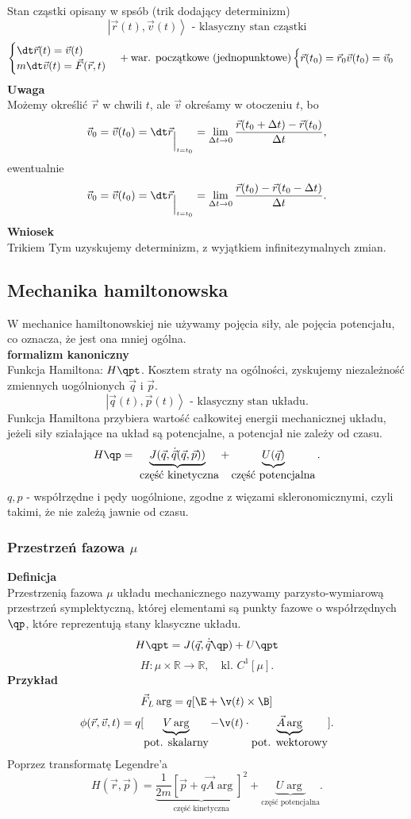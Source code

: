 Stan cząstki opisany w spsób (trik dodający determinizm) $$\left| \vec{r}(t)
,\vec{v}(t) \right> \mbox{ - klasyczny stan cząstki}$$
$$
\begin{cases} 
	\dt \vec{r}(t)=\vec{v}(t) &\\
	m\dt \vec{v}(t)=\vec{F}(\vec{r},t)
\end{cases} + \mbox{war. początkowe (jednopunktowe)} 
\begin{cases}
	\vec{r}(t_0)=\vec{r}_0
	\vec{v}(t_0)=\vec{v}_0
\end{cases}
$$
\textbf{Uwaga}\\
Możemy określić $\vec{r}$ w chwili $t$, ale $\vec{v}$ okreśamy w otoczeniu $t$,
bo
$$\vec{v}_0 = \vec{v}(t_0) = \dt \vec{r}_{\Big|_{t=t_0}} = \lim_{\Delta t \to 0}
\frac{\vec{r}(t_0+\Delta t)-\vec{r}(t_0)}{\Delta t},$$
ewentualnie
$$\vec{v}_0 = \vec{v}(t_0) = \dt \vec{r}_{\Big|_{t=t_0}} = \lim_{\Delta t \to 0}
\frac{\vec{r}(t_0)-\vec{r}(t_0-\Delta t)}{\Delta t}.$$
\textbf{Wniosek}\\
Trikiem Tym uzyskujemy determinizm, z wyjątkiem infinitezymalnych zmian.

\subsection{Mechanika hamiltonowska}
W mechanice hamiltonowskiej nie używamy pojęcia siły, ale pojęcia potencjału,
co oznacza, że jest ona mniej ogólna.\\

\textbf{formalizm kanoniczny}\\
Funkcja Hamiltona: $ H\qpt$. Kosztem straty na ogólności, zyskujemy 
niezależność zmiennych uogólnionych $\vec{q}$ i $\vec{p}$.\\
$$ \left| \vec{q}(t), \vec{p}(t) \right> \mbox{ - klasyczny stan układu.} $$
Funkcja Hamiltona przybiera wartość całkowitej energii mechanicznej układu, jeżeli
siły sziałające na układ są potencjalne, a potencjał nie zależy od czasu.
$$ H\qp = \underbrace{J(\vec{q},\dot{\vec{q}}(\vec{q},\vec{p}))}_{\mbox{
część kinetyczna}} + \underbrace{U(\vec{q})}_{\mbox{część potencjalna}}.$$
$q,p$ - współrzędne i pędy uogólnione, zgodne z więzami skleronomicznymi, czyli takimi, że nie zależą jawnie od czasu.
\subsubsection{Przestrzeń fazowa $\mu$}
\textbf{Definicja}\\
Przestrzenią fazowa $\mu$ układu mechanicznego nazywamy parzysto-wymiarową 
przestrzeń symplektyczną, której elementami są punkty fazowe o współrzędnych 
$\qp$, które reprezentują stany klasyczne układu.
$$ H\qpt = J(\vec{q},\dot{\vec{q}}\qp)+U\qpt $$
$$ H:\mu \times \mathbb{R} \to \mathbb{R}, \quad \mbox{kl. } C^1[\mu]. $$
\textbf{Przykład}\\
$$ \vec{F}_L \arg = q[\E+\v (t)\times\B]$$
$$ \phi (\vec{r},\vec{v},t) = q[ \underbrace{V\arg}_{\mbox{pot. skalarny}}
-\v (t) \cdot \underbrace{\vec{A} \arg }_{\mbox{pot. wektorowy}}]. $$
Poprzez transformatę Legendre'a
$$H(\vec{r},\vec{p}) = \underbrace{\frac{1}{2m} [\vec{p}+q\vec{A}\arg ]^2}_{\mbox{
część kinetyczna}} + \underbrace{U\arg}_{\mbox{część potencjalna}}.$$
